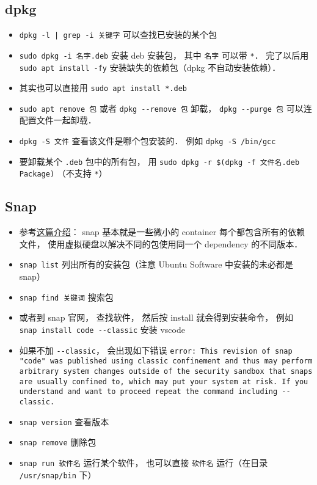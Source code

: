 \subsection{dpkg}
\begin{itemize}
\item \verb`dpkg -l | grep -i 关键字` 可以查找已安装的某个包
\item \verb|sudo dpkg -i 名字.deb| 安装 deb 安装包， 其中 \verb|名字| 可以带 \verb|*|． 完了以后用 \verb|sudo apt install -fy| 安装缺失的依赖包（dpkg 不自动安装依赖）．
\item 其实也可以直接用 \verb|sudo apt install *.deb|
\item \verb|sudo apt remove 包| 或者 \verb|dpkg --remove 包| 卸载， \verb|dpkg --purge 包| 可以连配置文件一起卸载．
\item \verb|dpkg -S 文件| 查看该文件是哪个包安装的． 例如 \verb|dpkg -S /bin/gcc|
\item 要卸载某个 \verb|.deb| 包中的所有包， 用 \verb|sudo dpkg -r $(dpkg -f 文件名.deb Package)| （不支持 \verb|*|）
\end{itemize}

\subsection{Snap}
\begin{itemize}
\item 参考\href{https://www.howtogeek.com/660193/how-to-work-with-snap-packages-on-linux/}{这篇介绍}： snap 基本就是一些微小的 container 每个都包含所有的依赖文件， 使用虚拟硬盘以解决不同的包使用同一个 dependency 的不同版本．
\item \verb|snap list| 列出所有的安装包（注意 Ubuntu Software 中安装的未必都是 snap）
\item \verb|snap find 关键词| 搜索包
\item 或者到 snap 官网， 查找软件， 然后按 install 就会得到安装命令， 例如 \verb|snap install code --classic| 安装 vscode
\item 如果不加 \verb|--classic|， 会出现如下错误 \verb|error: This revision of snap "code" was published using classic confinement and thus may perform arbitrary system changes outside of the security sandbox that snaps are usually confined to, which may put your system at risk. If you understand and want to proceed repeat the command including --classic.|
\item \verb|snap version| 查看版本
\item \verb|snap remove| 删除包
\item \verb|snap run 软件名| 运行某个软件， 也可以直接 \verb|软件名| 运行（在目录 \verb|/usr/snap/bin| 下）
\end{itemize}
